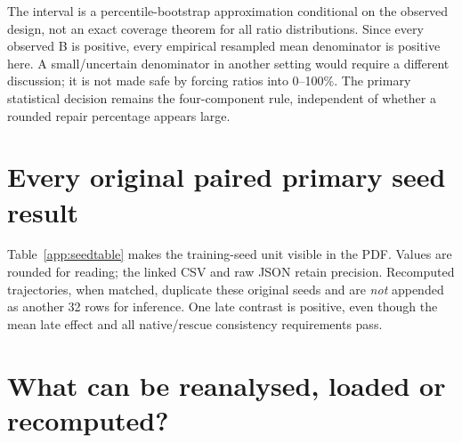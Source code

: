 The interval is a percentile-bootstrap approximation conditional on the observed design, not an exact coverage theorem for all ratio distributions. Since every observed B is positive, every empirical resampled mean denominator is positive here. A small/uncertain denominator in another setting would require a different discussion; it is not made safe by forcing ratios into 0--100\%. The primary statistical decision remains the four-component rule, independent of whether a rounded repair percentage appears large.

\section{Every original paired primary seed result}\label{app:seedrows}
Table~\ref{app:seedtable} makes the training-seed unit visible in the PDF. Values are rounded for reading; the linked CSV and raw JSON retain precision. Recomputed trajectories, when matched, duplicate these original seeds and are \emph{not} appended as another 32 rows for inference. One late contrast is positive, even though the mean late effect and all native/rescue consistency requirements pass.


\section{What can be reanalysed, loaded or recomputed?}\label{app:availability}


